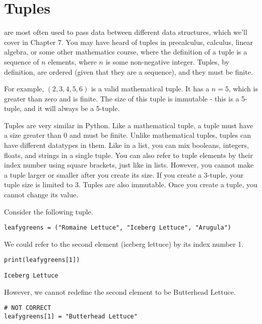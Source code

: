 \section{Tuples}
 are most often used to pass data between different data structures, which we'll cover in Chapter 7. You may have heard of tuples in precalculus, calculus, linear algebra, or some other mathematics course, where the definition of a tuple is a sequence of $n$ elements, where $n$ is some non-negative integer. Tuples, by definition, are ordered (given that they are a sequence), and they must be finite.\par
For example, $(2, 3, 4, 5, 6)$ is a valid mathematical tuple. It has a $n=5$, which is greater than zero and is finite. The size of this tuple is immutable - this is a 5-tuple, and it will always be a 5-tuple.\par
{}
Tuples are very similar in Python. Like a mathematical tuple, a tuple must have a size greater than 0 and must be finite. Unlike mathematical tuples, tuples can have different datatypes in them. Like in a list, you can mix booleans, integers, floats, and strings in a single tuple. You can also refer to tuple elements by their index number using square brackets, just like in lists. However, you cannot make a tuple larger or smaller after you create its size. If you create a 3-tuple, your tuple size is limited to 3. Tuples are also immutable. Once you create a tuple, you cannot change its value.\par
Consider the following tuple.\par
\begin{lstlisting}[style=pippython]
leafygreens = ("Romaine Lettuce", "Iceberg Lettuce", "Arugula")
\end{lstlisting}
We could refer to the second element (iceberg lettuce) by its index number 1.
\begin{lstlisting}[style=pippython]
print(leafygreens[1])
\end{lstlisting}
\begin{lstlisting}[style=none]
Iceberg Lettuce
\end{lstlisting}
However, we cannot redefine the second element to be Butterhead Lettuce.\par
\begin{lstlisting}[style=pippython]
# NOT CORRECT
leafygreens[1] = "Butterhead Lettuce"
\end{lstlisting}

